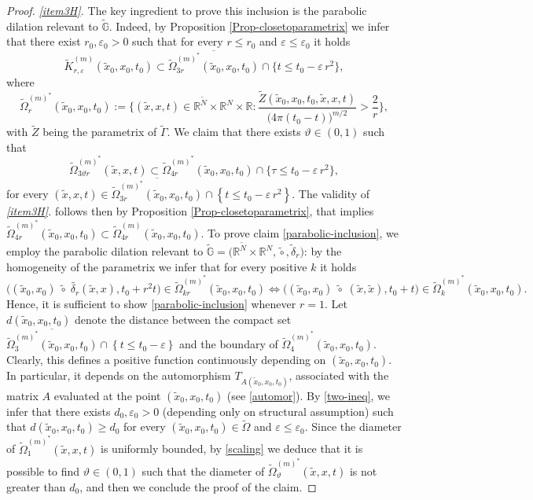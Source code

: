 \documentclass[11pt,a4paper]{article}
\numberwithin{equation}{section}
\newcommand{\R}{\mathbb{R}}
\def \rn {{\mathbb {R}}^{N}}
\def \rnm {{\mathbb {R}}^{\tilde N}}
\def \tt {\tilde}
\def \GG {{\mathbb{G}}}
\def \ti {\times}
\def \G {{\Gamma}}
\def \d {{\delta}}
\def \e {{\varepsilon}}
\def \t {{\tau}}
\def \O {{\Omega}}
\begin{document}
{{\begin{proof}
	
	\medskip
	\emph{\ref{item3H}.} The key ingredient to prove this inclusion is the parabolic dilation relevant to $\tt\GG$. Indeed, by Proposition \ref{Prop-closetoparametrix} we infer that there exist $r_0,\e_0>0$ such that for every $r\leq r_0$ and $\e\leq \e_0$ it holds
	\begin{equation}\label{casinalbo}
		\tt K_{r,\e}^{(m)}(\tt x_0, x_0, t_0)\subset \overline {\tt \O^{(m)^*}_{3 r}(\tt x_0, x_0, t_0)}\cap \Big\{t\leq t_0 -\e\, r^2\Big\},
	\end{equation} 
	where
	\begin{equation}
		\tt \O^{(m)^*}_{r}(\tt x_0,x_0, t_0):=\Bigg\{(\tt x, x ,t) \in \rnm\ti\rn\ti \R :\frac{\tt Z(\tt x_0, x_0, t_0,\tt x, x ,t)}{\big( 4\pi(t_0-t)\big)^{m/2}}>\frac{2}{r} \Bigg\},
	\end{equation}
	with $\tt Z$ being the parametrix of $\tt \G$. We claim that there exists $\vartheta \in (0,1)$ such that 
	\begin{equation}\label{parabolic-inclusion}
		\tt \O^{(m)^*}_{3\vartheta r}(\tt x, x, t)\subset \tt \O^{(m)^*}_{4 r}(\tt x_0, x_0, t_0)\cap \Big\{\t\leq t_0 - \e\,r^2\Big\},
	\end{equation}
	for every $(\tt x,x, t)\in  \overline {\tt \O^{(m)^*}_{3 r}(\tt x_0, x_0, t_0)}\cap \left\{t\leq t_0 - \e\, r^2\right\}$. The validity of \emph{\ref{item3H}.} follows then by Proposition \ref{Prop-closetoparametrix}, that implies $\tt \O^{(m)^*}_{4r}(\tt x_0,x_0, t_0)\subset\tt \O^{(m)}_{4r}(\tt x_0, x_0, t_0)$. To prove claim \eqref{parabolic-inclusion}, we employ the parabolic dilation relevant to $\tt\GG=\Big(\rnm\times \rn,\tt \circ,\tt \d_r\Big)$: by the homogeneity of the parametrix we infer that for every positive $k$ it holds 
	\begin{equation}\label{scaling}
		\Big((\tt x_0,x_0)\;\tt\circ \;\tt{\d_{r}}(\tt x,x),t_0+r^2t\Big)\in \tt \O^{(m)^*}_{k r}(\tt x_0,x_0, t_0)\iff \Big((\tt x_0,x_0)\;\tt\circ \;(\tt x,\tt x),t_0+t\Big)\in \tt \O^{(m)^*}_{k}(\tt x_0, x_0, t_0).
	\end{equation}
	Hence, it is sufficient to show \eqref{parabolic-inclusion} whenever $r=1$. Let $d(\tt x_0, x_0,t_0)$ denote the distance between the compact set $\overline {\tt \O^{(m)^*}_{3}(\tt x_0, x_0, t_0)}\cap \left\{t\leq t_0 - \e\right\}$ and the boundary of $\tt \O^{(m)^*}_{4}(\tt x_0, x_0, t_0)$. Clearly, this defines a positive function continuously depending on $(\tt x_0, x_0,t_0)$. In particular, it depends on the  automorphism $T_{A(\tt x_0, x_0,t_0)}$, associated with the matrix $A$ evaluated at the point $(\tt x_0, x_0,t_0)$ (see \eqref{automor}). By \eqref{two-ineq}, we infer that there exists $d_0,\e_0>0$ (depending only on structural assumption) such that $d(\tt x_0, x_0,t_0)\geq d_0$ for every $(\tt x_0, x_0,t_0)\in \tt\O$ and $\e\leq\e_0$. Since the diameter of $\tt\O_1^{(m)^*}(\tt x, x,t)$ is uniformly bounded, by \eqref{scaling} we deduce that it is possible to find $\vartheta \in (0,1)$ such that the diameter of $\tt\O_\vartheta^{(m)^*}(\tt x,x,t)$ is not greater than $d_0$, and then we conclude the proof of the claim.
	

\end{proof}}}
\end{document}
